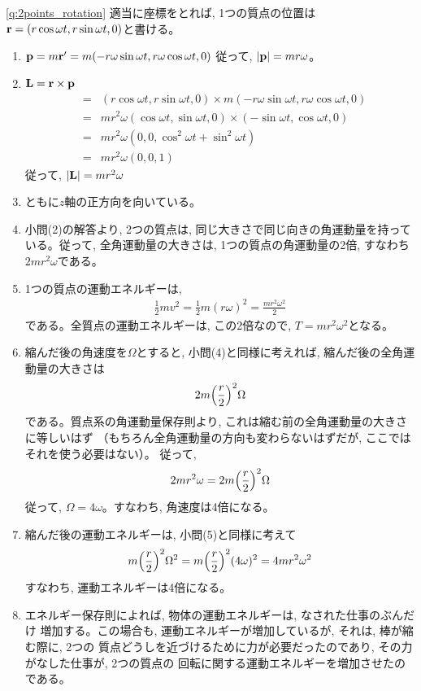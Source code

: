 \ref{q:2points_rotation}
適当に座標をとれば, 1つの質点の位置は
${\bf r}=(r\cos\omega t, r\sin\omega t, 0)$と書ける。
\begin{enumerate}
\item ${\bf p}=m{\bf r}'=m(-r\omega\sin\omega t, r\omega\cos\omega t, 0)$
従って, $|{\bf p}|=mr\omega$。
\item ${\bf L}={\bf r}\times{\bf p}$
\begin{eqnarray*}
  &=&(r\cos\omega t, r\sin\omega t, 0)\times m(-r\omega\sin\omega t, r\omega\cos\omega t, 0)\\
  &=&mr^2\omega(\cos\omega t, \sin\omega t, 0)\times (-\sin\omega t, \cos\omega t, 0)\\
  &=&mr^2\omega(0, 0, \cos^2\omega t+\sin^2\omega t)\\
  &=&mr^2\omega(0, 0, 1)
\end{eqnarray*}
従って, $|{\bf L}|=mr^2\omega$
\item ともに$z$軸の正方向を向いている。
\item 小問(2)の解答より, 2つの質点は, 同じ大きさで同じ向きの角運動量を持っている。従って, 
全角運動量の大きさは, 1つの質点の角運動量の2倍, すなわち$2mr^2\omega$である。
\item 1つの質点の運動エネルギーは, 
\begin{eqnarray*}\frac{1}{2}mv^2=\frac{1}{2}m(r\omega)^2=\frac{mr^2\omega^2}{2}\end{eqnarray*}
である。全質点の運動エネルギーは, この2倍なので, $T=mr^2\omega^2$となる。
\item 縮んだ後の角速度を$\Omega$とすると, 小問(4)と同様に考えれば, 
縮んだ後の全角運動量の大きさは
\begin{eqnarray*}2m\Bigl(\frac{r}{2}\Bigr)^2\Omega\end{eqnarray*}
である。質点系の角運動量保存則より, これは縮む前の全角運動量の大きさに等しいはず
（もちろん全角運動量の方向も変わらないはずだが, ここではそれを使う必要はない）。
従って, 
\begin{eqnarray*}2mr^2\omega=2m\Bigl(\frac{r}{2}\Bigr)^2\Omega\end{eqnarray*}
従って, $\Omega=4\omega$。すなわち, 角速度は4倍になる。
\item 縮んだ後の運動エネルギーは, 小問(5)と同様に考えて
\begin{eqnarray*}
m\Bigl(\frac{r}{2}\Bigr)^2\Omega^2
=m\Bigl(\frac{r}{2}\Bigr)^2(4\omega)^2
=4mr^2\omega^2
\end{eqnarray*}
すなわち, 運動エネルギーは4倍になる。
\item エネルギー保存則によれば, 物体の運動エネルギーは, なされた仕事のぶんだけ
増加する。この場合も, 運動エネルギーが増加しているが, それは, 棒が縮む際に, 2つの
質点どうしを近づけるために力が必要だったのであり, その力がなした仕事が, 2つの質点の
回転に関する運動エネルギーを増加させたのである。
\end{enumerate}
\hv




